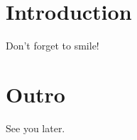 \documentclass[12pt]{article}
\begin{document}
    \section{Introduction}
        Don't forget to smile!
    \section{Outro}
        See you later.
\end{document}
